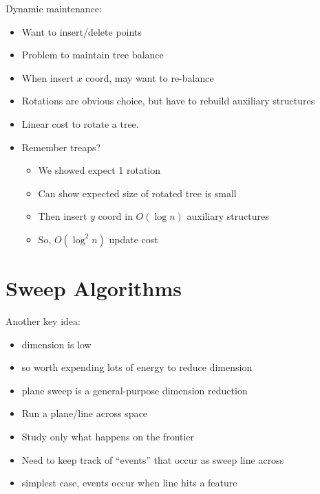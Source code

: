 \documentclass{article}
\begin{document}
Dynamic maintenance:
\begin{itemize}
\item Want to insert/delete points
\item Problem to maintain tree balance
\item When insert $x$ coord, may want to re-balance
\item Rotations are obvious choice, but have to rebuild auxiliary
  structures
\item Linear cost to rotate a tree.
\item Remember treaps?  
\begin{itemize}
\item We showed expect 1 rotation
\item Can show expected size of rotated tree is small
\item Then insert $y$ coord in $O(\log n)$ auxiliary structures
\item So, $O(\log^2 n)$ update cost
\end{itemize}
\end{itemize}

\newcommand{\indx}{\mathit{index}}


\section{Sweep Algorithms}

Another key idea: 
\begin{itemize}
\item dimension is low 
\item so worth expending lots of energy to reduce dimension
\item plane sweep is a general-purpose dimension reduction
\item Run a plane/line across space
\item Study only what happens on the frontier
\item Need to keep track of ``events'' that occur as sweep line across
\item simplest case, events occur when line hits a feature
\end{itemize}
\end{document}
